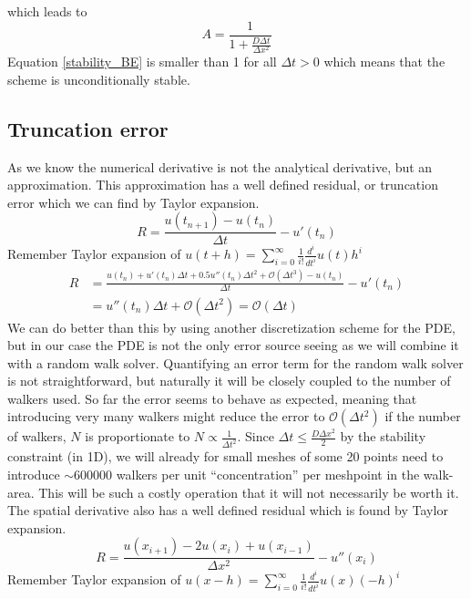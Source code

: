 which leads to 
\begin{equation}\label{stability_BE}
A = \frac{1}{ 1+\frac{D\Delta t}{\Delta x^2}}
\end{equation}
Equation \ref{stability_BE} is smaller than 1 for all $\Delta t>0$ which means that the scheme is unconditionally stable.

\subsection{Truncation error}\label{truncation_error}

As we know the numerical derivative is not the analytical derivative, but an approximation. 
This approximation has a well defined residual, or truncation error which we can find by Taylor expansion.
\begin{equation*}
  R = \frac{u(t_{n+1}) -u(t_n)}{\Delta t} -u'(t_n)
\end{equation*}
Remember Taylor expansion of $u(t+h) = \sum\limits_{i=0}^\infty\frac{1}{i!}\frac{d^i}{dt^i}u(t)h^i$
\begin{align*}
 R &= \frac{u(t_n)+u'(t_n)\Delta t +0.5u''(t_n)\Delta t^2 + \mathcal{O}(\Delta t^3)-u(t_n)}{\Delta t} -u'(t_n)\\
  &= u''(t_n)\Delta t+ \mathcal{O}(\Delta t^2) = \mathcal{O}(\Delta t)
\end{align*}
We can do better than this by using another discretization scheme for the PDE, but in our case the PDE is not the only error source seeing as we will combine it with a random walk solver. 
Quantifying an error term for the random walk solver is not straightforward, but naturally it will be closely coupled to the number of walkers used. 
So far the error seems to behave as expected, meaning that introducing very many walkers might reduce the error to $\mathcal{O}(\Delta t^2)$ if the number of walkers, $N$ is proportionate to $N\propto\frac{1}{\Delta t^2}$. 
Since $\Delta t \leq\frac{D\Delta x^2}{2}$ by the stability constraint (in 1D), we will already for small meshes of some 20 points need to introduce $\sim600000$ walkers per unit ``concentration'' per meshpoint in the walk-area. 
This will be such a costly operation that it will not necessarily be worth it.\\
The spatial derivative also has a well defined residual which is found by Taylor expansion.
\begin{equation}
R = \frac{u(x_{i+1})-2u(x_i)+u(x_{i-1})}{\Delta x^2}-u''(x_i) 
\end{equation}
Remember Taylor expansion of $u(x-h) = \sum\limits_{i=0}^\infty\frac{1}{i!}\frac{d^i}{dt^i}u(x)(-h)^i$
